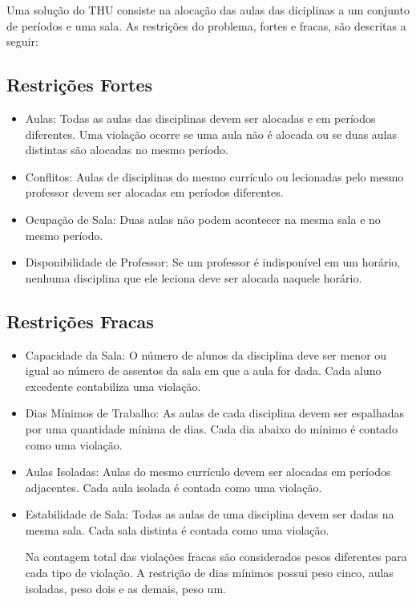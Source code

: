 \documentclass[11pt]{article}
\begin{document}
Uma solução do THU consiste na alocação das aulas das diciplinas a um conjunto de períodos e uma sala. As restrições do problema, fortes e fracas, são descritas a seguir:

\subsection{Restrições Fortes}

\begin{itemize}

\item Aulas: Todas as aulas das disciplinas devem ser alocadas e em períodos diferentes. Uma violação ocorre se uma aula não é alocada ou se duas aulas distintas são alocadas no mesmo período.

\item Conflitos: Aulas de disciplinas do mesmo currículo ou lecionadas pelo mesmo professor devem ser alocadas em períodos diferentes. 

\item Ocupação de Sala: Duas aulas não podem acontecer na mesma sala e no mesmo período.

\item Disponibilidade de Professor: Se um professor é indisponível em um horário, nenhuma disciplina que ele leciona deve ser alocada naquele horário.

\end{itemize}

\subsection{Restrições Fracas}

\begin{itemize}

\item Capacidade da Sala: O número de alunos da disciplina deve ser menor ou igual ao número de assentos da sala em que a aula for dada. Cada aluno excedente contabiliza uma violação.

\item Dias Mínimos de Trabalho: As aulas de cada disciplina devem ser espalhadas por uma quantidade mínima de dias. Cada dia abaixo do mínimo é contado como uma violação.

\item Aulas Isoladas: Aulas do mesmo currículo devem ser alocadas em períodos adjacentes. Cada aula isolada é contada como uma violação.

\item Estabilidade de Sala: Todas as aulas de uma disciplina devem ser dadas na mesma sala. Cada sala distinta é contada como uma violação.

Na contagem total das violações fracas são considerados pesos diferentes para cada tipo de violação. A restrição de dias mínimos possui peso cinco, aulas isoladas, peso dois e as demais, peso um.

\end{itemize}
\end{document}
